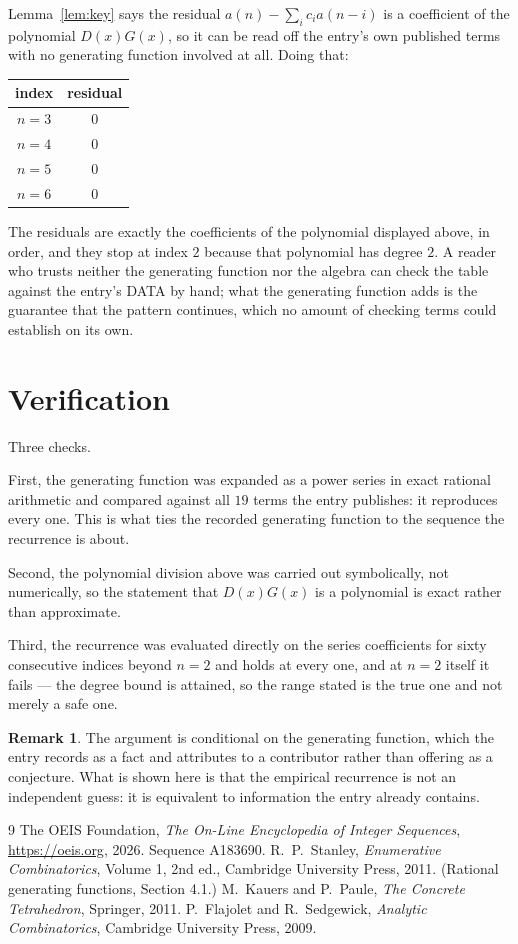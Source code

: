\documentclass[11pt,a4paper]{article}
\theoremstyle{plain}
\theoremstyle{definition}
\newtheorem{remark}[theorem]{Remark}
\begin{document}
Lemma~\ref{lem:key} says the residual $a(n)-\sum_ic_ia(n-i)$ is a coefficient of the
polynomial $D(x)G(x)$, so it can be read off the entry's own published terms with no
generating function involved at all. Doing that:
\begin{center}
\begin{tabular}{cc}
index & residual \\ \hline
$n=3$ & $0$ \\
$n=4$ & $0$ \\
$n=5$ & $0$ \\
$n=6$ & $0$
\end{tabular}
\end{center}
The residuals are exactly the coefficients of the polynomial displayed above, in order, and
they stop at index $2$ because that polynomial has degree $2$. A reader who trusts
neither the generating function nor the algebra can check the table against the entry's DATA
by hand; what the generating function adds is the guarantee that the pattern continues, which
no amount of checking terms could establish on its own.

\section{Verification}

Three checks.

First, the generating function was expanded as a power series in exact rational arithmetic and
compared against all $19$ terms the entry publishes: it reproduces every one. This is
what ties the recorded generating function to the sequence the recurrence is about.

Second, the polynomial division above was carried out symbolically, not numerically, so the
statement that $D(x)G(x)$ is a polynomial is exact rather than approximate.

Third, the recurrence was evaluated directly on the series coefficients for sixty consecutive
indices beyond $n=2$ and holds at every one, and at $n=2$ itself it fails --- the
degree bound is attained, so the range stated is the true one and not merely a safe one.

\begin{remark}
The argument is conditional on the generating function, which the entry records as a fact and
attributes to a contributor rather than offering as a conjecture. What is shown here is that
the empirical recurrence is not an independent guess: it is equivalent to information the
entry already contains.
\end{remark}

\begin{thebibliography}{9}
 The OEIS Foundation, \emph{The On-Line Encyclopedia of Integer
Sequences}, \url{https://oeis.org}, 2026. Sequence A183690.
 R.~P.~Stanley, \emph{Enumerative Combinatorics}, Volume 1, 2nd ed.,
Cambridge University Press, 2011. (Rational generating functions, Section 4.1.)
 M.~Kauers and P.~Paule, \emph{The Concrete Tetrahedron}, Springer, 2011.
 P.~Flajolet and R.~Sedgewick, \emph{Analytic Combinatorics}, Cambridge
University Press, 2009.
\end{thebibliography}
\end{document}
